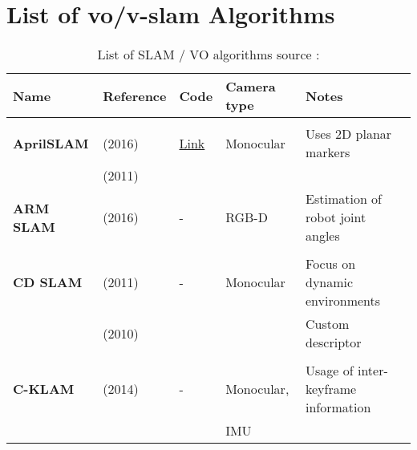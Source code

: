 \section{List of \acrshort{vo}/\acrshort{v-slam} Algorithms}
\label{section:A.1}
	{\footnotesize
		\begin{longtable}{l|l|l|l|l}
			\caption{List of SLAM / VO algorithms source :\cite{chris}}\\[2mm]
			\label{tab:list_found_slam_algorithms}
			\textbf{Name}            & \textbf{Reference}                     & \textbf{Code}                                                      & \textbf{Camera type}  & \textbf{Notes}\\
			\hline
			&                                   &                                                                    &                       &\\
			\textbf{AprilSLAM}     & \cite{Wang2016} (2016)            & \href{https://github.com/ProjectArtemis/aprilslam}{Link}           & Monocular             & Uses 2D planar markers\\
			& \cite{Olson2011} (2011)           &                                                                    &                       &\\
			\textbf{ARM SLAM}      & \cite{Klingensmith2016} (2016)    & -                                                                  & RGB-D                 & Estimation of robot joint angles\\
			&                                   &                                                                    &                       &\\
			\textbf{CD SLAM}       & \cite{Pirker2011} (2011)          & -                                                                  & Monocular             & Focus on dynamic environments\\
			& \cite{Pirker2010} (2010)          &                                                                    &                       & Custom descriptor\\
			&                                   &                                                                    &                       &\\
			\textbf{C-KLAM}        & \cite{Nerurkar2014} (2014)        & -                                                                  & Monocular,            & Usage of inter-keyframe information\\
			&                                   &                                                                    & IMU                   &\\

\end{longtable}}
